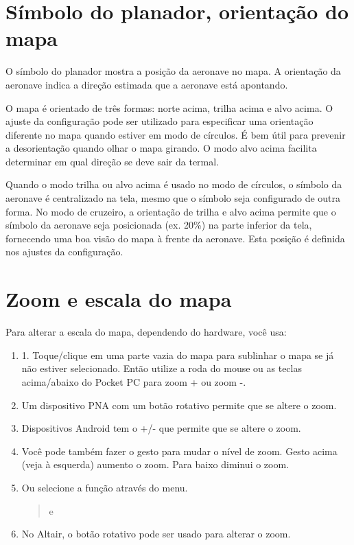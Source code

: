 \section{Símbolo do planador, orientação do mapa}
O símbolo do planador mostra a posição da aeronave no mapa.  A orientação da aeronave indica a direção estimada que a aeronave está apontando.

O mapa é orientado de três formas: norte acima, trilha acima e alvo acima.  O ajuste da configuração pode ser utilizado para especificar uma orientação diferente no mapa quando estiver em modo de círculos.  É bem útil para prevenir a desorientação quando olhar o mapa girando.  O modo alvo acima facilita determinar em qual direção se deve sair da termal.

Quando o modo trilha ou alvo acima é usado no modo de círculos, o símbolo da aeronave é centralizado na tela, mesmo que o símbolo seja configurado de outra forma.  No modo de cruzeiro, a orientação de trilha e alvo acima permite que o símbolo da aeronave seja posicionada (ex. 20\%) na parte inferior da tela, fornecendo uma boa visão do mapa à frente da aeronave.  Esta posição é definida nos ajustes da configuração.  

\section{Zoom e escala do mapa}\label{sec:zooming}

Para alterar a escala do mapa, dependendo do hardware, você usa:
\begin{enumerate}
\item 1.	Toque/clique em uma parte vazia do mapa para sublinhar o mapa se já não estiver selecionado.  Então utilize a roda do mouse ou as teclas acima/abaixo do Pocket PC para zoom + ou zoom -.
\item Um dispositivo PNA com um botão rotativo permite que se altere o zoom.
\item Dispositivos Android tem o +/- que permite que se altere o zoom.
\item Você pode também fazer o gesto para mudar o nível de zoom. Gesto acima (veja à esquerda) aumento o zoom.  Para baixo diminui o zoom.
\item Ou selecione a função através do menu.
\begin{quote}
\blink{} e 
\end{quote}
\item No Altair, o botão rotativo pode ser usado para alterar o zoom.
\end{enumerate}

